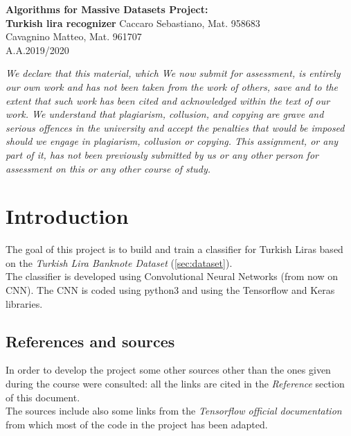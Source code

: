 \documentclass[a4paper,12pt]{article}
\begin{document}
\begin{titlepage}
\begin{center}
	\Large{\textbf{Algorithms for Massive Datasets Project:\\Turkish lira recognizer}}
\vfill
\normalsize{Caccaro Sebastiano, Mat. 958683}\\
\normalsize{Cavagnino Matteo, Mat. 961707}\\
\normalsize{A.A.2019/2020}
\end{center}
\end{titlepage}

\vspace*{\fill}
\textit{We declare that this material, which We now submit for assessment, is entirely our own work and has not been taken from the work of others, save and to the extent that such work has been cited and acknowledged within the text of our work. We understand that plagiarism, collusion, and copying are grave and serious offences in the university and accept the penalties that would be imposed should we engage in plagiarism, collusion or copying. This assignment, or any part of it, has not been previously submitted by us or any other person for assessment on this or any other course of study.}
\vspace*{\fill}

\newpage

\tableofcontents

\clearpage


\newpage
\section{Introduction}
The goal of this project is to build and train a classifier for Turkish Liras based on the \textit{Turkish Lira Banknote Dataset} (\autoref{sec:dataset}).\\
The classifier is developed using Convolutional Neural Networks (from now on CNN). The CNN is coded using python3 and using the Tensorflow and Keras libraries.

\subsection{References and sources}
In order to develop the project some other sources other than the ones given during the course were consulted: all the links are cited in the \textit{Reference} section of this document.\\
The sources include also some links from the \textit{Tensorflow official documentation} from which most of the code in the project has been adapted.
\end{document}
